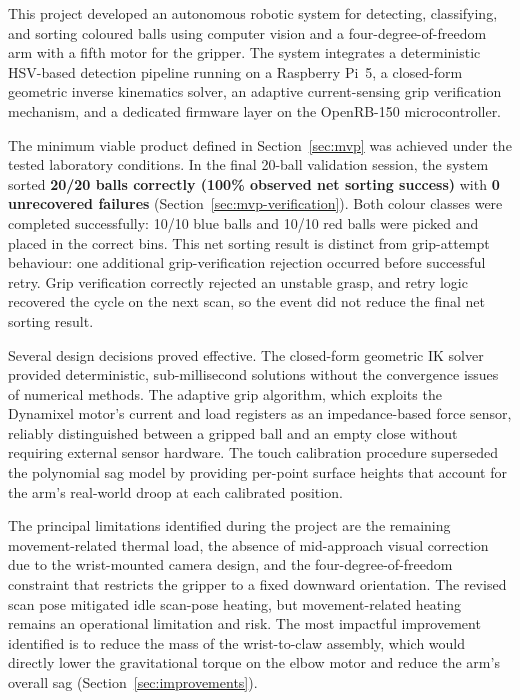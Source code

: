 
This project developed an autonomous robotic system for
detecting, classifying, and sorting coloured balls using
computer vision and a four-degree-of-freedom arm with a fifth
motor for the gripper. The system integrates
a deterministic HSV-based detection pipeline running on a
Raspberry Pi~5, a closed-form geometric inverse kinematics
solver, an adaptive current-sensing grip verification mechanism,
and a dedicated firmware layer on the OpenRB-150 microcontroller.

The minimum viable product defined in Section~\ref{sec:mvp} was achieved
under the tested laboratory conditions. In the final 20-ball
validation session, the system sorted \textbf{20/20 balls
correctly (100\% observed net sorting success)} with \textbf{0
unrecovered failures} (Section~\ref{sec:mvp-verification}). Both colour classes were
completed successfully: 10/10 blue balls and 10/10 red balls were
picked and placed in the correct bins. This net sorting result is
distinct from grip-attempt behaviour: one additional
grip-verification rejection occurred before successful retry. Grip
verification correctly rejected an unstable grasp, and retry logic
recovered the cycle on the next scan, so the event did not reduce
the final net sorting result.

Several design decisions proved effective. The closed-form
geometric IK solver provided deterministic, sub-millisecond
solutions without the convergence issues of numerical methods.
The adaptive grip algorithm, which exploits the Dynamixel
motor's current and load registers as an impedance-based force
sensor, reliably distinguished between a gripped ball and an
empty close without requiring external sensor hardware. The
touch calibration procedure superseded the polynomial sag model
by providing per-point surface heights that account for the
arm's real-world droop at each calibrated position.

The principal limitations identified during the project are the
remaining movement-related thermal load, the absence of
mid-approach visual correction due to the wrist-mounted camera
design, and the four-degree-of-freedom constraint that restricts
the gripper to a fixed downward orientation. The revised scan
pose mitigated idle scan-pose heating, but movement-related
heating remains an operational limitation and risk. The most
impactful improvement identified is to reduce the mass of the
wrist-to-claw assembly, which would directly lower the
gravitational torque on the elbow motor and reduce the arm's
overall sag (Section~\ref{sec:improvements}).
